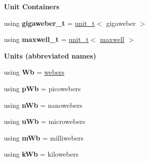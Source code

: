 \begin{Indent}{\bf Unit Containers}
\begin{DoxyCompactItemize}
\item 
\hypertarget{namespaceunits_1_1magnetic__flux_a8e72d95e0772398f2499e1df1f494b51}{}using {\bfseries gigaweber\+\_\+t} = \hyperlink{classunits_1_1unit__t}{unit\+\_\+t}$<$ gigaweber $>$\label{namespaceunits_1_1magnetic__flux_a8e72d95e0772398f2499e1df1f494b51}

\item 
\hypertarget{namespaceunits_1_1magnetic__flux_a3f2d3012adb9761b8e9b233b749e07b8}{}using {\bfseries maxwell\+\_\+t} = \hyperlink{classunits_1_1unit__t}{unit\+\_\+t}$<$ \hyperlink{structunits_1_1unit}{maxwell} $>$\label{namespaceunits_1_1magnetic__flux_a3f2d3012adb9761b8e9b233b749e07b8}

\end{DoxyCompactItemize}
\end{Indent}
\begin{Indent}{\bf Units (abbreviated names)}\par
\begin{DoxyCompactItemize}
\item 
\hypertarget{namespaceunits_1_1magnetic__flux_a4c4b63a0e39fa39897c2ef4a781c74be}{}using {\bfseries Wb} = \hyperlink{structunits_1_1unit}{webers}\label{namespaceunits_1_1magnetic__flux_a4c4b63a0e39fa39897c2ef4a781c74be}

\item 
\hypertarget{namespaceunits_1_1magnetic__flux_ac27d6fb15f08d5c801c1636c8d3fda7b}{}using {\bfseries p\+Wb} = picowebers\label{namespaceunits_1_1magnetic__flux_ac27d6fb15f08d5c801c1636c8d3fda7b}

\item 
\hypertarget{namespaceunits_1_1magnetic__flux_a4f2da188ab57cfc4c294e901c91f3a77}{}using {\bfseries n\+Wb} = nanowebers\label{namespaceunits_1_1magnetic__flux_a4f2da188ab57cfc4c294e901c91f3a77}

\item 
\hypertarget{namespaceunits_1_1magnetic__flux_a32b5dfc9c2dfbf056356e71b6f84884c}{}using {\bfseries u\+Wb} = microwebers\label{namespaceunits_1_1magnetic__flux_a32b5dfc9c2dfbf056356e71b6f84884c}

\item 
\hypertarget{namespaceunits_1_1magnetic__flux_a8ab3a519874c53fa258f124f6c398845}{}using {\bfseries m\+Wb} = milliwebers\label{namespaceunits_1_1magnetic__flux_a8ab3a519874c53fa258f124f6c398845}

\item 
\hypertarget{namespaceunits_1_1magnetic__flux_a7420aefba0d75facf496c8fcf527e692}{}using {\bfseries k\+Wb} = kilowebers\label{namespaceunits_1_1magnetic__flux_a7420aefba0d75facf496c8fcf527e692}


\end{DoxyCompactItemize}
\end{Indent}
